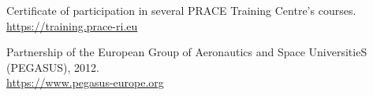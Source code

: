 \documentclass[11pt,a4paper]{article}
\begin{document}
Certificate of participation in several PRACE Training Centre's courses.\\
\url{https://training.prace-ri.eu}

\medskip
Partnership of the European Group of Aeronautics and Space UniversitieS (PEGASUS), 2012.\\
\url{https://www.pegasus-europe.org}

\end{document}
